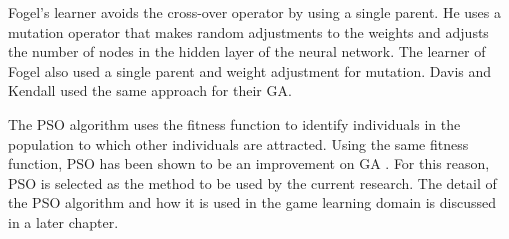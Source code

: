 Fogel's  learner \cite{fogel:networks} avoids the cross-over operator by using a single parent.  He uses a mutation operator that makes random adjustments to the weights and adjusts the number of nodes in the hidden layer of the neural network. The  learner of Fogel \etal \cite{fogel:chess} also used a single parent and weight adjustment for mutation. Davis and Kendall \cite{davis:evolve} used the same approach for their GA.   

The PSO algorithm uses the fitness function to identify individuals in the population to which other individuals are attracted.  Using the same fitness function, PSO has been shown to be an improvement on GA \cite{franken:checkers,franken:evolving,messerschmidt:learning}.  For this reason, PSO is selected as the method to be used by the current research.  The detail of the PSO algorithm and how it is used in the game learning domain is discussed in a later chapter.
